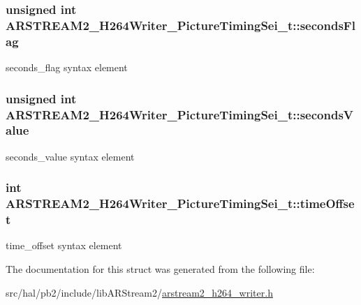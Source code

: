 \subsubsection[{\texorpdfstring{seconds\+Flag}{secondsFlag}}]{\setlength{\rightskip}{0pt plus 5cm}unsigned int A\+R\+S\+T\+R\+E\+A\+M2\+\_\+\+H264\+Writer\+\_\+\+Picture\+Timing\+Sei\+\_\+t\+::seconds\+Flag}\hypertarget{struct_a_r_s_t_r_e_a_m2___h264_writer___picture_timing_sei__t_aea4792ac9f9f6f14f4705c1217f3e560}{}\label{struct_a_r_s_t_r_e_a_m2___h264_writer___picture_timing_sei__t_aea4792ac9f9f6f14f4705c1217f3e560}
seconds\+\_\+flag syntax element 
\subsubsection[{\texorpdfstring{seconds\+Value}{secondsValue}}]{\setlength{\rightskip}{0pt plus 5cm}unsigned int A\+R\+S\+T\+R\+E\+A\+M2\+\_\+\+H264\+Writer\+\_\+\+Picture\+Timing\+Sei\+\_\+t\+::seconds\+Value}\hypertarget{struct_a_r_s_t_r_e_a_m2___h264_writer___picture_timing_sei__t_afaee6f8411a520ad46e55f02329722cb}{}\label{struct_a_r_s_t_r_e_a_m2___h264_writer___picture_timing_sei__t_afaee6f8411a520ad46e55f02329722cb}
seconds\+\_\+value syntax element 
\subsubsection[{\texorpdfstring{time\+Offset}{timeOffset}}]{\setlength{\rightskip}{0pt plus 5cm}int A\+R\+S\+T\+R\+E\+A\+M2\+\_\+\+H264\+Writer\+\_\+\+Picture\+Timing\+Sei\+\_\+t\+::time\+Offset}\hypertarget{struct_a_r_s_t_r_e_a_m2___h264_writer___picture_timing_sei__t_ae2ca661c9c9fa76f8e833c29075adbb9}{}\label{struct_a_r_s_t_r_e_a_m2___h264_writer___picture_timing_sei__t_ae2ca661c9c9fa76f8e833c29075adbb9}
time\+\_\+offset syntax element 

The documentation for this struct was generated from the following file\+:\begin{DoxyCompactItemize}
\item 
src/hal/pb2/include/lib\+A\+R\+Stream2/\hyperlink{arstream2__h264__writer_8h}{arstream2\+\_\+h264\+\_\+writer.\+h}\end{DoxyCompactItemize}
